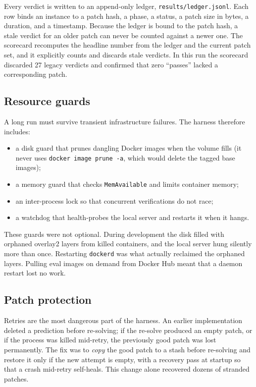 \documentclass[11pt,a4paper]{article}
\begin{document}
Every verdict is written to an append-only ledger,
\texttt{results/ledger.jsonl}. Each row binds an instance to a patch hash, a phase, a
status, a patch size in bytes, a duration, and a timestamp. Because the ledger is bound
to the patch hash, a stale verdict for an older patch can never be counted against a
newer one. The scorecard recomputes the headline number from the ledger and the current
patch set, and it explicitly counts and discards stale verdicts. In this run the
scorecard discarded 27 legacy verdicts and confirmed that zero ``passes'' lacked a
corresponding patch.

\subsection{Resource guards}

A long run must survive transient infrastructure failures. The harness therefore
includes:

\begin{itemize}[leftmargin=1.4em]
  \item a disk guard that prunes dangling Docker images when the volume fills (it never
  uses \texttt{docker image prune -a}, which would delete the tagged base images);
  \item a memory guard that checks \texttt{MemAvailable} and limits container memory;
  \item an inter-process lock so that concurrent verifications do not race;
  \item a watchdog that health-probes the local server and restarts it when it hangs.
\end{itemize}

These guards were not optional. During development the disk filled with orphaned
overlay2 layers from killed containers, and the local server hung silently more than
once. Restarting \texttt{dockerd} was what actually reclaimed the orphaned layers.
Pulling eval images on demand from Docker Hub meant that a daemon restart lost no work.

\subsection{Patch protection}

Retries are the most dangerous part of the harness. An earlier implementation deleted a
prediction before re-solving; if the re-solve produced an empty patch, or if the process
was killed mid-retry, the previously good patch was lost permanently. The fix was to
\emph{copy} the good patch to a stash before re-solving and restore it only if the new
attempt is empty, with a recovery pass at startup so that a crash mid-retry self-heals.
This change alone recovered dozens of stranded patches.
\end{document}
